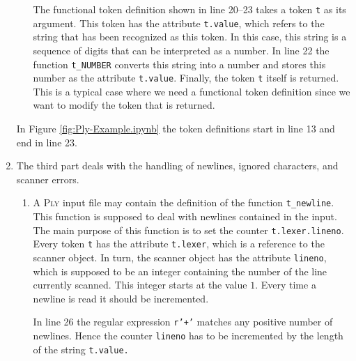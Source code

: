 \begin{enumerate}
\begin{enumerate}
            The functional token definition shown in line 20--23 takes a token \texttt{t} as its
            argument.  This token has the attribute \texttt{t.value}, which refers to the string that has been
            recognized as this token.  In this case, this string is a sequence of digits that can be
            interpreted as a number.  In line 22 the function  \texttt{t\_NUMBER} converts this string into a
            number and stores this number as the attribute \texttt{t.value}.  Finally, the token \texttt{t}
            itself is returned.  This is a typical case where we need a functional token definition since we 
            want to modify the token that is returned.
      \end{enumerate}
      In Figure \ref{fig:Ply-Example.ipynb} the token definitions start in line 13 and end in line 23.
\item The third part deals with the handling of newlines, ignored characters, and scanner errors.
  \begin{enumerate}
  \item A \textsc{Ply} input file may contain the definition of the function \texttt{t\_newline}.
        This function is supposed to deal with newlines contained in the input.  The main purpose of this
        function is to set the  
        counter \texttt{t.lexer.lineno}.  Every token \texttt{t} has the attribute \texttt{t.lexer}, which is a
        reference to the scanner object.  In turn, the scanner object has the attribute \texttt{lineno}, which
        is supposed to be an integer containing the number of the line currently scanned.  This integer starts
        at the value $1$.  Every time a newline is read it should be incremented.

        In line 26 the regular expression \texttt{r'+'} matches any positive number of newlines.
        Hence the counter \texttt{lineno} has to be incremented by the length of the string \texttt{t.value.}


\end{enumerate}
\end{enumerate}
